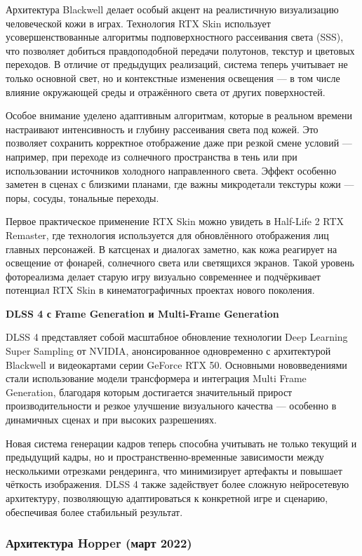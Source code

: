 \documentclass{article}[14pt]
\begin{document}
Архитектура Blackwell делает особый акцент на реалистичную визуализацию человеческой кожи в играх. Технология RTX Skin использует 
усовершенствованные алгоритмы подповерхностного рассеивания света (SSS), что позволяет добиться правдоподобной передачи полутонов, текстур и 
цветовых переходов. В отличие от предыдущих реализаций, система теперь учитывает не только основной свет, но и контекстные изменения 
освещения — в том числе влияние окружающей среды и отражённого света от других поверхностей.

Особое внимание уделено адаптивным алгоритмам, которые в реальном времени настраивают интенсивность и глубину рассеивания света под кожей. 
Это позволяет сохранить корректное отображение даже при резкой смене условий — например, при переходе из солнечного пространства в тень или 
при использовании источников холодного направленного света. Эффект особенно заметен в сценах с близкими планами, где важны микродетали 
текстуры кожи — поры, сосуды, тональные переходы.

Первое практическое применение RTX Skin можно увидеть в Half-Life 2 RTX Remaster, где технология используется для обновлённого отображения 
лиц главных персонажей. В катсценах и диалогах заметно, как кожа реагирует на освещение от фонарей, солнечного света или светящихся экранов. 
Такой уровень фотореализма делает старую игру визуально современнее и подчёркивает потенциал RTX Skin в кинематографичных проектах нового 
поколения.

\noindent \textbf{DLSS 4 с Frame Generation и Multi-Frame Generation}

DLSS 4 представляет собой масштабное обновление технологии Deep Learning Super Sampling от NVIDIA, анонсированное одновременно с архитектурой 
Blackwell и видеокартами серии GeForce RTX 50. Основными нововведениями стали использование модели трансформера и интеграция Multi Frame 
Generation, благодаря которым достигается значительный прирост производительности и резкое улучшение визуального качества — особенно в 
динамичных сценах и при высоких разрешениях.

Новая система генерации кадров теперь способна учитывать не только текущий и предыдущий кадры, но и пространственно-временные зависимости 
между несколькими отрезками рендеринга, что минимизирует артефакты и повышает чёткость изображения. DLSS 4 также задействует более сложную 
нейросетевую архитектуру, позволяющую адаптироваться к конкретной игре и сценарию, обеспечивая более стабильный результат.

\subsubsection{Архитектура Hopper (март 2022)}
\end{document}
